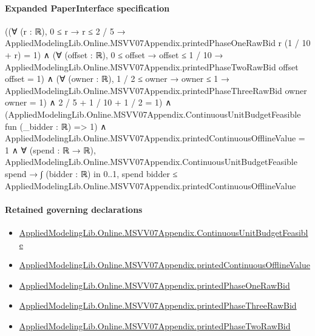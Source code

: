 \documentclass[10pt]{article}
\begin{document}
\paragraph{Expanded PaperInterface specification}
\begin{ReviewVerbatim}
((∀ (r : ℝ), 0 ≤ r → r ≤ 2 / 5 → AppliedModelingLib.Online.MSVV07Appendix.printedPhaseOneRawBid r (1 / 10 + r) = 1) ∧
    (∀ (offset : ℝ),
        0 ≤ offset →
          offset ≤ 1 / 10 → AppliedModelingLib.Online.MSVV07Appendix.printedPhaseTwoRawBid offset offset = 1) ∧
      (∀ (owner : ℝ),
          1 / 2 ≤ owner →
            owner ≤ 1 → AppliedModelingLib.Online.MSVV07Appendix.printedPhaseThreeRawBid owner owner = 1) ∧
        2 / 5 + 1 / 10 + 1 / 2 = 1) ∧
  (AppliedModelingLib.Online.MSVV07Appendix.ContinuousUnitBudgetFeasible fun (_bidder : ℝ) => 1) ∧
    AppliedModelingLib.Online.MSVV07Appendix.printedContinuousOfflineValue = 1 ∧
      ∀ (spend : ℝ → ℝ),
        AppliedModelingLib.Online.MSVV07Appendix.ContinuousUnitBudgetFeasible spend →
          ∫ (bidder : ℝ) in 0..1, spend bidder ≤ AppliedModelingLib.Online.MSVV07Appendix.printedContinuousOfflineValue
\end{ReviewVerbatim}

\paragraph{Retained governing declarations}
\begin{itemize}\raggedright
\item \hyperlink{governing-declaration-7007fb2a7bf81a00}{Applied\allowbreak{}Modeling\allowbreak{}Lib.\allowbreak{}Online.\allowbreak{}MSVV07\allowbreak{}Appendix.\allowbreak{}Continuous\allowbreak{}Unit\allowbreak{}Budget\allowbreak{}Feasible}
\item \hyperlink{governing-declaration-e5424fafce38493a}{Applied\allowbreak{}Modeling\allowbreak{}Lib.\allowbreak{}Online.\allowbreak{}MSVV07\allowbreak{}Appendix.\allowbreak{}printed\allowbreak{}Continuous\allowbreak{}Offline\allowbreak{}Value}
\item \hyperlink{governing-declaration-4d20215fe0889cc5}{Applied\allowbreak{}Modeling\allowbreak{}Lib.\allowbreak{}Online.\allowbreak{}MSVV07\allowbreak{}Appendix.\allowbreak{}printed\allowbreak{}Phase\allowbreak{}One\allowbreak{}Raw\allowbreak{}Bid}
\item \hyperlink{governing-declaration-3d57613424e2bae2}{Applied\allowbreak{}Modeling\allowbreak{}Lib.\allowbreak{}Online.\allowbreak{}MSVV07\allowbreak{}Appendix.\allowbreak{}printed\allowbreak{}Phase\allowbreak{}Three\allowbreak{}Raw\allowbreak{}Bid}
\item \hyperlink{governing-declaration-4ff20a2682fb293c}{Applied\allowbreak{}Modeling\allowbreak{}Lib.\allowbreak{}Online.\allowbreak{}MSVV07\allowbreak{}Appendix.\allowbreak{}printed\allowbreak{}Phase\allowbreak{}Two\allowbreak{}Raw\allowbreak{}Bid}
\end{itemize}
\end{document}
